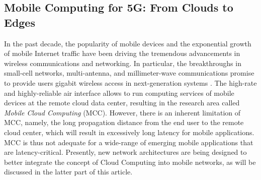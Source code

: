 \documentclass[journal]{IEEEtran}
\begin{document}
\subsection{Mobile Computing for 5G: From Clouds to Edges}
In the past decade, the popularity of mobile devices and the exponential growth of mobile Internet traffic have been driving  the tremendous advancements in wireless communications and networking. In particular,  the breakthroughs in small-cell networks, multi-antenna, and millimeter-wave  communications promise to provide users gigabit wireless access in next-generation systems \cite{andrews2014will}.  The high-rate and highly-reliable air interface allows to run computing services of mobile devices at the remote cloud data center, resulting in  the research area called \emph{Mobile Cloud Computing} (MCC). However, there is an inherent limitation of MCC, namely, the long propagation distance from the end user to the remote cloud center, which will result in excessively long latency for mobile applications. MCC is thus not adequate for a wide-range of emerging mobile applications that are latency-critical. Presently, new network architectures are being designed to better integrate the concept of Cloud Computing into mobile networks, as will be discussed in the latter part of this article.
\end{document}
